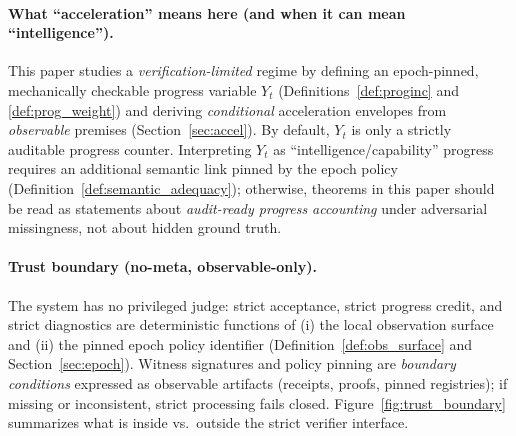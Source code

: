 \documentclass[11pt]{article}
\newcommand{\1}{\mathbf{1}}
\theoremstyle{definition}
\theoremstyle{plain}
\begin{document}
\paragraph{What ``acceleration'' means here (and when it can mean ``intelligence'').}
This paper studies a \emph{verification-limited} regime by defining an epoch-pinned, mechanically checkable progress variable $Y_t$ (Definitions~\ref{def:proginc} and \ref{def:prog_weight}) and deriving \emph{conditional} acceleration envelopes from \emph{observable} premises (Section~\ref{sec:accel}).
By default, $Y_t$ is only a strictly auditable progress counter.
Interpreting $Y_t$ as ``intelligence/capability'' progress requires an additional semantic link pinned by the epoch policy (Definition~\ref{def:semantic_adequacy}); otherwise, theorems in this paper should be read as statements about \emph{audit-ready progress accounting} under adversarial missingness, not about hidden ground truth.

\paragraph{Trust boundary (no-meta, observable-only).}
The system has no privileged judge: strict acceptance, strict progress credit, and strict diagnostics are deterministic functions of (i) the local observation surface and (ii) the pinned epoch policy identifier (Definition~\ref{def:obs_surface} and Section~\ref{sec:epoch}).
Witness signatures and policy pinning are \emph{boundary conditions} expressed as observable artifacts (receipts, proofs, pinned registries); if missing or inconsistent, strict processing fails closed.
Figure~\ref{fig:trust_boundary} summarizes what is inside vs.\ outside the strict verifier interface.
\end{document}
